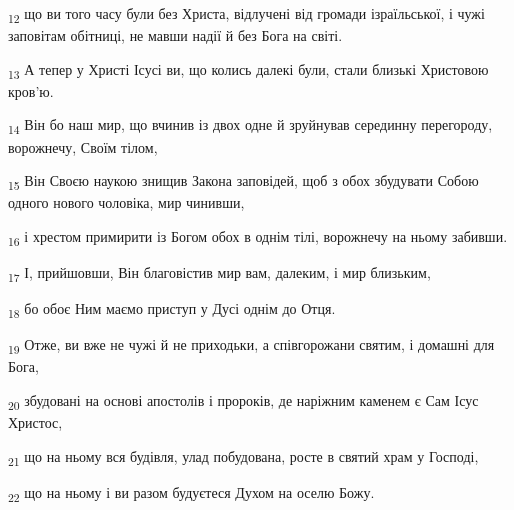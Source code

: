 \begin{tcolorbox}
\textsubscript{12} що ви того часу були без Христа, відлучені від громади ізраїльської, і чужі заповітам обітниці, не мавши надії й без Бога на світі.
\end{tcolorbox}
\begin{tcolorbox}
\textsubscript{13} А тепер у Христі Ісусі ви, що колись далекі були, стали близькі Христовою кров'ю.
\end{tcolorbox}
\begin{tcolorbox}
\textsubscript{14} Він бо наш мир, що вчинив із двох одне й зруйнував серединну перегороду, ворожнечу, Своїм тілом,
\end{tcolorbox}
\begin{tcolorbox}
\textsubscript{15} Він Своєю наукою знищив Закона заповідей, щоб з обох збудувати Собою одного нового чоловіка, мир чинивши,
\end{tcolorbox}
\begin{tcolorbox}
\textsubscript{16} і хрестом примирити із Богом обох в однім тілі, ворожнечу на ньому забивши.
\end{tcolorbox}
\begin{tcolorbox}
\textsubscript{17} І, прийшовши, Він благовістив мир вам, далеким, і мир близьким,
\end{tcolorbox}
\begin{tcolorbox}
\textsubscript{18} бо обоє Ним маємо приступ у Дусі однім до Отця.
\end{tcolorbox}
\begin{tcolorbox}
\textsubscript{19} Отже, ви вже не чужі й не приходьки, а співгорожани святим, і домашні для Бога,
\end{tcolorbox}
\begin{tcolorbox}
\textsubscript{20} збудовані на основі апостолів і пророків, де наріжним каменем є Сам Ісус Христос,
\end{tcolorbox}
\begin{tcolorbox}
\textsubscript{21} що на ньому вся будівля, улад побудована, росте в святий храм у Господі,
\end{tcolorbox}
\begin{tcolorbox}
\textsubscript{22} що на ньому і ви разом будуєтеся Духом на оселю Божу.
\end{tcolorbox}
